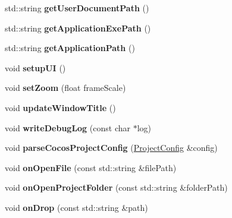 \begin{DoxyCompactItemize}
std\+::string {\bfseries get\+User\+Document\+Path} ()
\item 
\mbox{\label{classSimulatorWin_a23ab0b92e0d387bbbc131f9773a275d0}} 
std\+::string {\bfseries get\+Application\+Exe\+Path} ()
\item 
\mbox{\label{classSimulatorWin_adb010374b0d4cfdd77f254de3a366b1e}} 
std\+::string {\bfseries get\+Application\+Path} ()
\item 
\mbox{\label{classSimulatorWin_a4b82fff88984ba4c4727f5e7421a22bf}} 
void {\bfseries setup\+UI} ()
\item 
\mbox{\label{classSimulatorWin_ae49626e326e01ab0b9e6ed8611cb64e6}} 
void {\bfseries set\+Zoom} (float frame\+Scale)
\item 
\mbox{\label{classSimulatorWin_a7f8669c4d57d6ecc96c9124989199c1e}} 
void {\bfseries update\+Window\+Title} ()
\item 
\mbox{\label{classSimulatorWin_a9478a4cd59aa4d289be9d8cb1f0afed6}} 
void {\bfseries write\+Debug\+Log} (const char $\ast$log)
\item 
\mbox{\label{classSimulatorWin_af09e6dee29ac84dc83df86dbb12277b7}} 
void {\bfseries parse\+Cocos\+Project\+Config} (\hyperlink{classProjectConfig}{Project\+Config} \&config)
\item 
\mbox{\label{classSimulatorWin_a4ab5c2ade926a3219b658521f8570bbd}} 
void {\bfseries on\+Open\+File} (const std\+::string \&file\+Path)
\item 
\mbox{\label{classSimulatorWin_ad11ff25ca66679a4267a02b26c3f50bd}} 
void {\bfseries on\+Open\+Project\+Folder} (const std\+::string \&folder\+Path)
\item 
\mbox{\label{classSimulatorWin_a2ea0f6f99a0427ebe6d8d53db970c44d}} 
void {\bfseries on\+Drop} (const std\+::string \&path)
\item 
\mbox{\label{classSimulatorWin_ae9060f7d65b28f049d9715fa439ff02b}} 

\end{DoxyCompactItemize}
